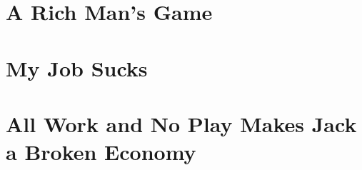 \documentclass[12pt]{memoir}
\begin{document}
			
		
		 \section{A Rich Man's Game}
		 
		\section{My Job Sucks}
		
		\section{All Work and No Play Makes Jack a Broken Economy}
		
\end{document}
